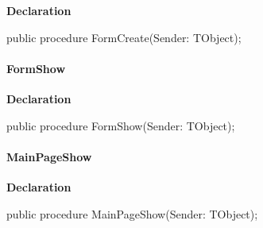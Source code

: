 \documentclass{report}
\newif\ifpdf
\begin{document}
\label{settings.TFmConfig-FormCreate}
\begin{list}{}{
\setlength{\itemindent}{0cm}
\setlength{\listparindent}{0cm}
\setlength{\leftmargin}{\evensidemargin}
\addtolength{\leftmargin}{\tmplength}
\settowidth{\labelsep}{X}
\addtolength{\leftmargin}{\labelsep}
\setlength{\labelwidth}{\tmplength}
}
\item[\textbf{Declaration}\hfill]
\ifpdf
\begin{flushleft}
\fi
\begin{ttfamily}
public procedure FormCreate(Sender: TObject);\end{ttfamily}

\ifpdf
\end{flushleft}
\fi

\end{list}
\paragraph*{FormShow}\hspace*{\fill}

\label{settings.TFmConfig-FormShow}
\begin{list}{}{
\setlength{\itemindent}{0cm}
\setlength{\listparindent}{0cm}
\setlength{\leftmargin}{\evensidemargin}
\addtolength{\leftmargin}{\tmplength}
\settowidth{\labelsep}{X}
\addtolength{\leftmargin}{\labelsep}
\setlength{\labelwidth}{\tmplength}
}
\item[\textbf{Declaration}\hfill]
\ifpdf
\begin{flushleft}
\fi
\begin{ttfamily}
public procedure FormShow(Sender: TObject);\end{ttfamily}

\ifpdf
\end{flushleft}
\fi

\end{list}
\paragraph*{MainPageShow}\hspace*{\fill}

\label{settings.TFmConfig-MainPageShow}
\begin{list}{}{
\setlength{\itemindent}{0cm}
\setlength{\listparindent}{0cm}
\setlength{\leftmargin}{\evensidemargin}
\addtolength{\leftmargin}{\tmplength}
\settowidth{\labelsep}{X}
\addtolength{\leftmargin}{\labelsep}
\setlength{\labelwidth}{\tmplength}
}
\item[\textbf{Declaration}\hfill]
\ifpdf
\begin{flushleft}
\fi
\begin{ttfamily}
public procedure MainPageShow(Sender: TObject);\end{ttfamily}

\ifpdf
\end{flushleft}
\fi

\end{list}
\end{document}
